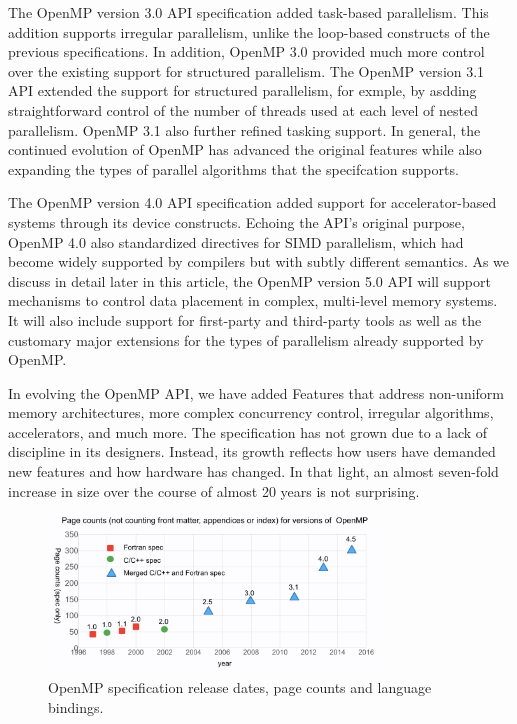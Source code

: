 The OpenMP version 3.0 API specification added task-based parallelism.
This addition supports irregular parallelism, unlike the loop-based
constructs of the previous specifications. In addition, OpenMP 3.0
provided much more control over the existing support for structured
parallelism. The OpenMP version 3.1 API extended the support for 
structured parallelism, for exmple, by asdding straightforward control
of the number of threads used at each level of nested parallelism. 
OpenMP 3.1 also further refined tasking support. In general, the 
continued evolution of OpenMP has advanced the original features 
while also expanding the types of parallel algorithms that the 
specifcation supports.

The OpenMP version 4.0 API specification added support for accelerator-based 
systems through its device constructs. Echoing the API's original purpose, 
OpenMP 4.0 also standardized directives for SIMD parallelism, which 
had become widely supported by compilers but with subtly different 
semantics. As we discuss in detail later in this article, the OpenMP
version 5.0 API will support mechanisms to control data placement in
complex, multi-level memory systems. It will also include support for
first-party and third-party tools as well as the customary major 
extensions for the types of parallelism already supported by OpenMP.

In evolving the OpenMP API, we have added Features that address 
non-uniform memory architectures, more complex concurrency control, 
irregular algorithms, accelerators, and much more. The specification 
has not grown due to a lack of discipline in its designers. Instead,
its growth reflects how users have demanded new features and how
hardware has changed. In that light, an almost seven-fold increase 
in size over the course of almost 20 years is not surprising.

\begin{figure}
  \centering
  \includegraphics[width=3.4in]{pics/opcounts.png}
  \caption{OpenMP specification release dates, page counts and language bindings.}
  \label{omppcount}
\end{figure}


